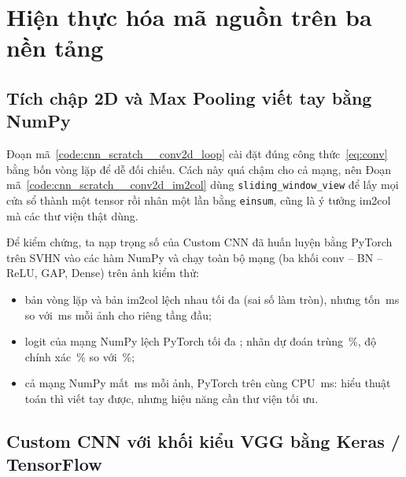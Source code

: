 \section{Hiện thực hóa mã nguồn trên ba nền tảng}

\subsection{Tích chập 2D và Max Pooling viết tay bằng NumPy}

Đoạn mã~\ref{code:cnn_scratch__conv2d_loop} cài đặt đúng công thức~\eqref{eq:conv} bằng bốn vòng lặp để dễ đối chiếu.
Cách này quá chậm cho cả mạng, nên Đoạn mã~\ref{code:cnn_scratch__conv2d_im2col} dùng \texttt{sliding\_window\_view} để
lấy mọi cửa sổ thành một tensor rồi nhân một lần bằng \texttt{einsum}, cũng là ý tưởng im2col mà các thư viện thật dùng.


Để kiểm chứng, ta nạp trọng số của Custom CNN đã huấn luyện bằng PyTorch trên SVHN vào các hàm NumPy và chạy toàn bộ mạng
(ba khối conv -- BN -- ReLU, GAP, Dense) trên  ảnh kiểm thử:
\begin{itemize}
  \item bản vòng lặp và bản im2col lệch nhau tối đa  (sai số làm tròn), nhưng
    tốn \,ms so với \,ms mỗi ảnh cho riêng tầng đầu;
  \item logit của mạng NumPy lệch PyTorch tối đa ; nhãn dự đoán trùng
    \,\%, độ chính xác \,\% so với \,\%;
  \item cả mạng NumPy mất \,ms mỗi ảnh, PyTorch trên cùng CPU
    \,ms: hiểu thuật toán thì viết tay được, nhưng hiệu năng cần thư viện tối ưu.
\end{itemize}

\subsection{Custom CNN với khối kiểu VGG bằng Keras / TensorFlow}

